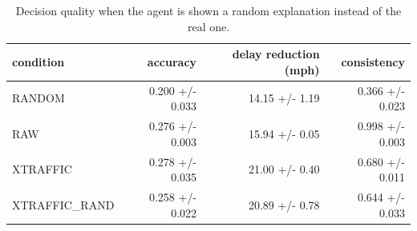 \begin{table}[t]
\centering
\caption{Decision quality when the agent is shown a random explanation instead of the real one.}
\label{tab:decisions}
\begin{tabular}{lrrr}
\toprule
condition & accuracy & delay reduction (mph) & consistency \\
\midrule
RANDOM & 0.200 +/- 0.033 & 14.15 +/- 1.19 & 0.366 +/- 0.023 \\
RAW & 0.276 +/- 0.003 & 15.94 +/- 0.05 & 0.998 +/- 0.003 \\
XTRAFFIC & 0.278 +/- 0.035 & 21.00 +/- 0.40 & 0.680 +/- 0.011 \\
XTRAFFIC_RAND & 0.258 +/- 0.022 & 20.89 +/- 0.78 & 0.644 +/- 0.033 \\
\bottomrule
\end{tabular}
\end{table}
